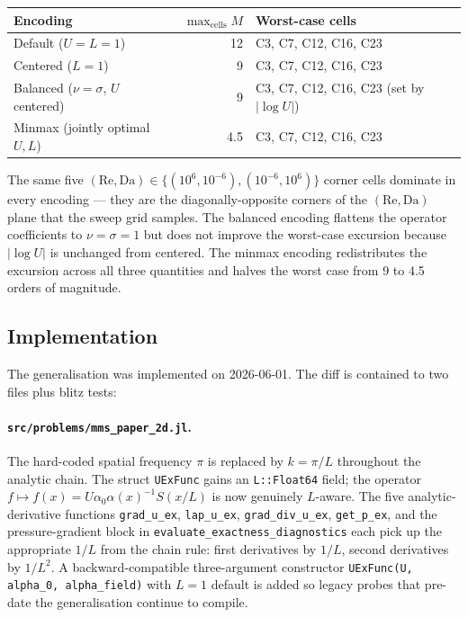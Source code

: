 \documentclass[11pt]{article}
\newcommand{\code}[1]{\texttt{#1}}
\begin{document}
\begin{center}
\begin{tabular}{lrl}
  \toprule
  Encoding & $\max_{\mathrm{cells}} M$ & Worst-case cells \\
  \midrule
  Default ($U = L = 1$)             & 12  & C3, C7, C12, C16, C23 \\
  Centered ($L = 1$)                & 9   & C3, C7, C12, C16, C23 \\
  Balanced ($\nu = \sigma$, $U$ centered) & 9 & C3, C7, C12, C16, C23 (set by $|\log U|$) \\
  Minmax (jointly optimal $U, L$)   & 4.5 & C3, C7, C12, C16, C23 \\
  \bottomrule
\end{tabular}
\end{center}

\noindent The same five $(\mathrm{Re}, \mathrm{Da}) \in
\{(10^{6}, 10^{-6}), (10^{-6}, 10^{6})\}$ corner cells dominate in
every encoding — they are the diagonally-opposite corners of the
$(\mathrm{Re}, \mathrm{Da})$ plane that the sweep grid samples. The
balanced encoding flattens the operator coefficients to
$\nu = \sigma = 1$ but does not improve the worst-case excursion
because $|\log U|$ is unchanged from centered. The minmax encoding
redistributes the excursion across all three quantities and halves
the worst case from 9 to 4.5 orders of magnitude.

\subsection{Implementation}
\label{sec:varL-impl}

The generalisation was implemented on 2026-06-01. The diff is contained
to two files plus blitz tests:

\paragraph{\texttt{src/problems/mms\_paper\_2d.jl}.}  The hard-coded
spatial frequency $\pi$ is replaced by $k = \pi / L$ throughout the
analytic chain. The struct \code{UExFunc} gains an
\code{L::Float64} field; the operator
$f \mapsto f(x) = U \alpha_0 \alpha(x)^{-1} S(x/L)$ is now genuinely
$L$-aware. The five analytic-derivative functions
\code{grad\_u\_ex}, \code{lap\_u\_ex}, \code{grad\_div\_u\_ex},
\code{get\_p\_ex}, and the pressure-gradient block in
\code{evaluate\_exactness\_diagnostics} each pick up the appropriate
$1/L$ from the chain rule: first derivatives by $1/L$, second
derivatives by $1/L^2$. A backward-compatible three-argument constructor
\code{UExFunc(U, alpha\_0, alpha\_field)} with $L = 1$ default is added
so legacy probes that pre-date the generalisation continue to compile.
\end{document}
